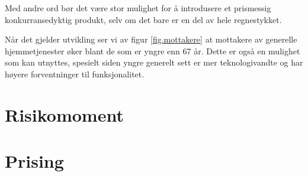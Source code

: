 Med andre ord bør det være stor mulighet for å introdusere et prismessig
konkurransedyktig produkt, selv om det bare er en del av hele regnestykket.

Når det gjelder utvikling ser vi av figur \vref{fig.mottakere} at mottakere av
generelle hjemmetjenester øker blant de som er yngre enn 67 år. Dette er også
en mulighet som kan utnyttes, spesielt siden yngre generelt sett er mer
teknologivandte og har høyere forventninger til funksjonalitet.




\section{Risikomoment}

\section{Prising}
